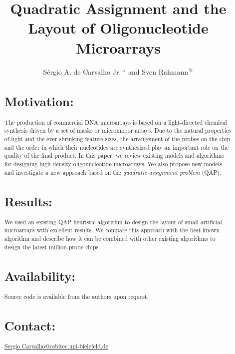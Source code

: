 \documentclass{bioinfo}
\begin{document}

\title[short Title]{Quadratic Assignment and the Layout of Oligonucleotide Microarrays}
\author[Sample \textit{et~al}]{S\'ergio A. de Carvalho Jr.\,$^{\rm a}$ and Sven Rahmann\,$^{\rm b}$}
\address{$^{\rm a}$Graduiertenkolleg Bioinformatik, Bielefeld University, Germany,\\$^{\rm b}$Algorithms and Statistics for Systems Biology, Genome Informatics, Bielefeld University, Germany.}
\maketitle

\begin{abstract}

\section{Motivation:}
The production of commercial DNA microarrays is based on a light-directed chemical synthesis driven by a set of masks or micromirror arrays. Due to the natural properties of light and the ever shrinking feature sizes, the arrangement of the probes on the chip and the order in which their nucleotides are synthesized play an important role on the quality of the final product. In this paper, we review existing models and algorithms for designing high-density oligonucleotide microarrays. We also propose new models and investigate a new approach based on the \emph{quadratic assignment problem} (QAP).
\section{Results:}
We used an existing QAP heuristic algorithm to design the layout of small artificial microarrays with excellent results. We compare this approach with the best known algorithm and describe how it can be combined with other existing algorithms to design the latest million-probe chips.
\section{Availability:}
Source code is available from the authors upon request.
\section{Contact:} \href{Sergio.Carvalho@cebitec.uni-bielefeld.de}{Sergio.Carvalho@cebitec.uni-bielefeld.de}
\end{abstract}
\end{document}

